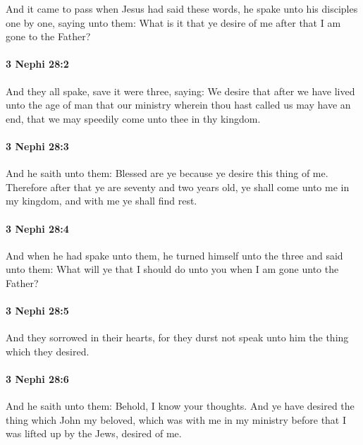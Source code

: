 			And it came to pass when Jesus had said these words,
			he spake unto his disciples one by one, saying unto them:
			What is it that ye desire of me after that I am gone to the Father?

		\paragraph{3 Nephi 28:2} %
			\label{3NEPHI-28-2}

			And they all spake, save it were three, saying:
			We desire that after we have lived unto the age of man
			that our ministry wherein thou hast called us may have an end,
			that we may speedily come unto thee in thy kingdom.

		\paragraph{3 Nephi 28:3} %
			\label{3NEPHI-28-3}

			And he saith unto them:
			Blessed are ye because ye desire this thing of me.
			Therefore after that ye are seventy and two years old,
			ye shall come unto me in my kingdom,
			and with me ye shall find rest.

		\paragraph{3 Nephi 28:4} %
			\label{3NEPHI-28-4}

			And when he had spake unto them,
			he turned himself unto the three and said unto them:
			What will ye that I should do unto you when I am gone unto the Father?

		\paragraph{3 Nephi 28:5} %
			\label{3NEPHI-28-5}

			And they sorrowed in their hearts,
			for they durst not speak unto him the thing which they desired.

		\paragraph{3 Nephi 28:6} %
			\label{3NEPHI-28-6}

			And he saith unto them:
			Behold, I know your thoughts.
			And ye have desired the thing
			which John my beloved,
			which was with me in my ministry before that I was lifted up by the Jews,
			desired of me.

